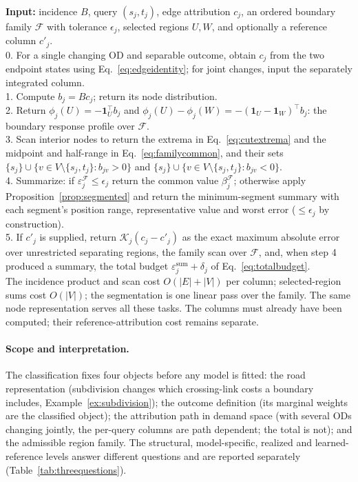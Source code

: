 \documentclass[a4paper,fleqn]{cas-sc}
\begin{document}
\begin{algo}[t]
\caption{From an OD demand change to a delivered spatial explanation}\label{alg:spatial}
\small
\textbf{Input:} incidence $B$, query $(s_j,t_j)$, edge attribution $c_j$,
an ordered boundary family $\mathcal F$ with tolerance $\epsilon_j$,
selected regions $U,W$, and optionally a reference column $c'_j$.\\
0. For a single changing OD and separable outcome, obtain $c_j$ from the two endpoint states using Eq.~\eqref{eq:edgeidentity}; for joint changes, input the separately integrated column.\\
1. Compute $b_j=Bc_j$; return its node distribution.\\
2. Return $\phi_j(U)=-\mathbf1_U^\top b_j$ and
$\phi_j(U)-\phi_j(W)=-(\mathbf1_U-\mathbf1_W)^\top b_j$: the boundary
response profile over $\mathcal F$.\\
3. Scan interior nodes to return the extrema in Eq.~\eqref{eq:cutextrema}
and the midpoint and half-range in Eq.~\eqref{eq:familycommon},
and their sets $\{s_j\}\cup\{v\in V\setminus\{s_j,t_j\}:b_{jv}>0\}$ and
$\{s_j\}\cup\{v\in V\setminus\{s_j,t_j\}:b_{jv}<0\}$.\\
4. Summarize: if $\varepsilon_j^{\mathcal F}\le\epsilon_j$ return the common
value $\beta_j^{\mathcal F}$; otherwise apply
Proposition~\ref{prop:segmented} and return the minimum-segment
summary with each segment's position range, representative value and
worst error ($\le\epsilon_j$ by construction).\\
5. If $c'_j$ is supplied, return $\mathcal K_j(c_j-c'_j)$ as the exact
maximum absolute error over unrestricted separating regions, the family
scan over $\mathcal F$, and, when step 4 produced a summary, the total
budget $\varepsilon^{\mathrm{sum}}_j+\delta_j$ of
Eq.~\eqref{eq:totalbudget}.\\
The incidence product and scan cost $O(|E|+|V|)$ per column; selected-region
sums cost $O(|V|)$; the segmentation is one linear pass over the family.
The same node representation serves all these tasks. The columns must already
have been computed; their reference-attribution cost remains separate.
\end{algo}



\paragraph{Scope and interpretation.}\label{sec:noninheritance}
The classification fixes four objects before any model is fitted: the
road representation (subdivision changes which crossing-link costs a
boundary includes, Example~\ref{ex:subdivision}); the outcome
definition (its marginal weights are the classified object); the
attribution path in demand space (with several ODs changing jointly,
the per-query columns are path dependent; the total is not); and the
admissible region family. The structural, model-specific, realized and
learned-reference levels answer different questions and are reported
separately (Table~\ref{tab:threequestions}).
\end{document}

